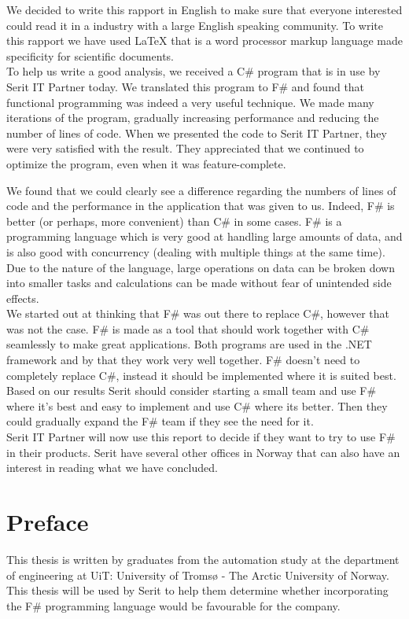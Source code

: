 \documentclass[12pt, a4paper]{article}
\begin{document}
We decided to write this rapport in English to make sure that everyone interested could read it in a industry with a large English speaking community. To write this rapport we have used LaTeX that is a word processor markup language made specificity for scientific documents.\\

To help us write a good analysis, we received a C\# program that is in use by Serit IT Partner today. We translated this program to F\# and found that functional programming was indeed a very useful technique. We made many iterations of the program, gradually increasing performance and reducing the number of lines of code. When we presented the code to Serit IT Partner, they were very satisfied with the result. They appreciated that we continued to optimize the program, even when it was feature-complete.

We found that we could clearly see a difference regarding the numbers of lines of code and the performance in the application that was given to us. Indeed, F\# is better (or perhaps, more convenient) than C\# in some cases. F\# is a programming language which is very good at handling large amounts of data, and is also good with concurrency (dealing with multiple things at the same time). Due to the nature of the language, large operations on data can be broken down into smaller tasks and calculations can be made without fear of unintended side effects.\\

We started out at thinking that F\# was out there to replace C\#, however that was not the case. F\# is made as a tool that should work together with C\# seamlessly to make great applications. Both programs are used in the .NET framework and by that they work very well together. F\# doesn't need to completely replace C\#, instead it should be implemented where it is suited best. Based on our results Serit should consider starting a small team and use F\# where it's best and easy to implement and use C\# where its better. Then they could gradually expand the F\# team if they see the need for it.\\

Serit IT Partner will now use this report to decide if they want to try to use F\# in their products. Serit have several other offices in Norway that can also have an interest in reading what we have concluded.

\newpage
\section*{Preface}
This thesis is written by graduates from the automation study at the department of engineering  at UiT: University of Tromsø - The Arctic University of Norway. This thesis will be used by Serit to help them determine whether incorporating the F\# programming language would be favourable for the company.\\
\end{document}
